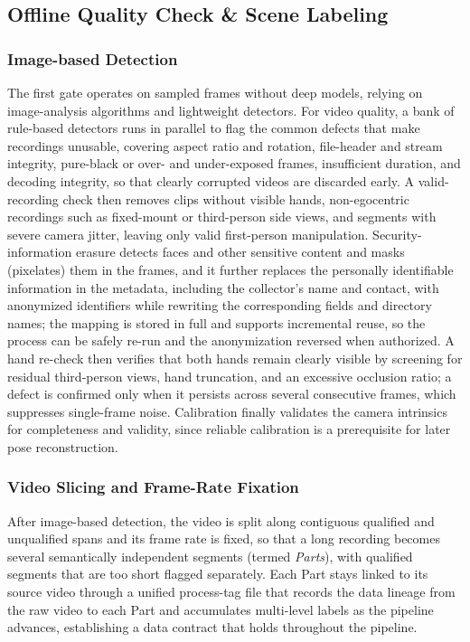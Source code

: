 \subsection{Offline Quality Check \& Scene Labeling}

\subsubsection{Image-based Detection}

The first gate operates on sampled frames without deep models, relying on image-analysis algorithms and lightweight detectors.
For video quality, a bank of rule-based detectors runs in parallel to flag the common defects that make recordings unusable, covering aspect ratio and rotation, file-header and stream integrity, pure-black or over- and under-exposed frames, insufficient duration, and decoding integrity, so that clearly corrupted videos are discarded early.
A valid-recording check then removes clips without visible hands, non-egocentric recordings such as fixed-mount or third-person side views, and segments with severe camera jitter, leaving only valid first-person manipulation.
Security-information erasure detects faces and other sensitive content and masks (pixelates) them in the frames, and it further replaces the personally identifiable information in the metadata, including the collector's name and contact, with anonymized identifiers while rewriting the corresponding fields and directory names; the mapping is stored in full and supports incremental reuse, so the process can be safely re-run and the anonymization reversed when authorized.
A hand re-check then verifies that both hands remain clearly visible by screening for residual third-person views, hand truncation, and an excessive occlusion ratio; a defect is confirmed only when it persists across several consecutive frames, which suppresses single-frame noise.
Calibration finally validates the camera intrinsics for completeness and validity, since reliable calibration is a prerequisite for later pose reconstruction.

\subsubsection{Video Slicing and Frame-Rate Fixation}

After image-based detection, the video is split along contiguous qualified and unqualified spans and its frame rate is fixed, so that a long recording becomes several semantically independent segments (termed \emph{Parts}), with qualified segments that are too short flagged separately.
Each Part stays linked to its source video through a unified process-tag file that records the data lineage from the raw video to each Part and accumulates multi-level labels as the pipeline advances, establishing a data contract that holds throughout the pipeline.


